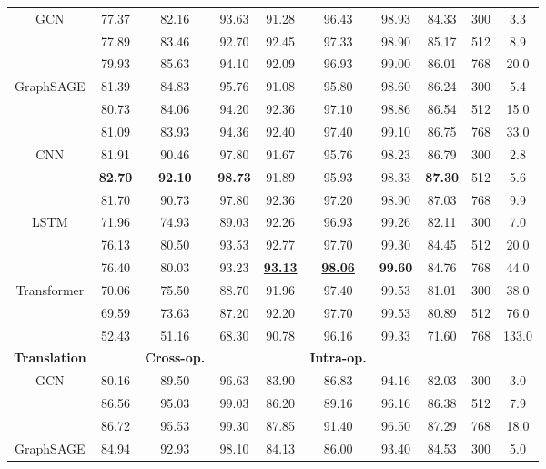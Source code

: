 \documentclass[11pt]{article}
\begin{document}
\begin{table}[th]
\begin{tabular}{c|ccc|ccc|c|cc}
        \midrule
       GCN & 77.37 & 82.16 & 93.63 & 91.28 & 96.43 & 98.93 & 84.33 & 300 & 3.3\\
       & 77.89 & 83.46 & 92.70 & 92.45 & 97.33 & 98.90 & 85.17 & 512 & 8.9\\
       & 79.93 & 85.63 & 94.10 & 92.09 & 96.93 & 99.00 & 86.01 & 768 & 20.0\\
       GraphSAGE  & 81.39 & 84.83 & 95.76 & 91.08 & 95.80 & 98.60 & 86.24 & 300 & 5.4\\
       & 80.73 & 84.06 & 94.20 & 92.36 & 97.10 & 98.86 & 86.54 & 512 & 15.0\\
       & 81.09 & 83.93 & 94.36 & 92.40 & 97.40 & 99.10 & 86.75 & 768 & 33.0\\
       \midrule
       CNN& 
       81.91 & 90.46 & 97.80 & 91.67 & 95.76 & 98.23 & 86.79 & 300 & 2.8\\
       & \textbf{82.70} & \textbf{92.10} & \textbf{98.73} & 91.89 & 95.93 & 98.33 & \textbf{87.30} & 512 & 5.6\\
       & 81.70 & 90.73 & 97.80 & 92.36 & 97.20 & 98.90 & 87.03 & 768 & 9.9\\
       LSTM & 71.96 & 74.93 & 89.03 & 92.26 & 96.93 & 99.26 & 82.11 & 300 & 7.0\\
       & 76.13 & 80.50 & 93.53 & 92.77 & 97.70 & 99.30 & 84.45 & 512 & 20.0\\
       & 76.40 & 80.03 & 93.23 & \underline{\textbf{93.13}} & \underline{\textbf{98.06}} & \textbf{99.60} & 84.76 & 768 & 44.0\\
       Transformer
       & 70.06 & 75.50 & 88.70 & 91.96 & 97.40 & 99.53 & 81.01 & 300 & 38.0\\
        &  69.59 &  73.63 & 87.20 &  92.20 & 97.70  &  99.53 & 80.89 & 512 & 76.0\\
       & 52.43 & 51.16 & 68.30 & 90.78 & 96.16 & 99.33 & 71.60 & 768 & 133.0\\
        \midrule
       \textbf{Translation} & & \textbf{Cross-op.} & & & \textbf{Intra-op.} & & & \\
       \midrule
       GCN & 80.16 & 89.50 & 96.63 & 83.90 & 86.83 & 94.16 & 82.03 & 300 & 3.0\\
       & 86.56 & 95.03 & 99.03 & 86.20 & 89.16 & 96.16 & 86.38 & 512 & 7.9\\
       & 86.72 & 95.53 & 99.30 & 87.85 & 91.40 & 96.50 & 87.29 & 768 & 18.0\\
        GraphSAGE & 84.94 & 92.93 & 98.10 & 84.13 & 86.00 & 93.40 & 84.53 & 300 & 5.0\\

\end{tabular}
\end{table}
\end{document}
